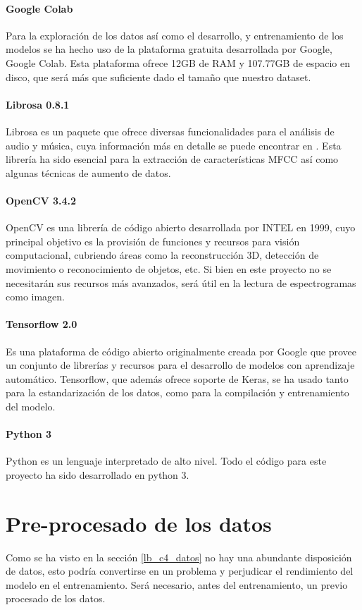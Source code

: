 \documentclass[11pt,a4paper,spanish]{book}
\begin{document}
	
	\paragraph{Google Colab} Para la exploración de los datos así como el desarrollo, y entrenamiento de los modelos se ha hecho uso de la plataforma gratuita desarrollada por Google, Google Colab. Esta plataforma ofrece 12GB de RAM  y 107.77GB de espacio en disco, que será más que suficiente dado el tamaño que nuestro dataset.
	
	\paragraph{Librosa 0.8.1} Librosa es un paquete que ofrece diversas funcionalidades para el análisis de audio y música, cuya información más en detalle se puede encontrar en \cite{librosa082}. Esta librería ha sido esencial para la extracción de características MFCC así como algunas técnicas de aumento de datos.
	
	\paragraph{OpenCV 3.4.2} OpenCV es una librería de código abierto desarrollada por INTEL en 1999, cuyo principal objetivo es la provisión de funciones y recursos para visión computacional, cubriendo áreas como la reconstrucción 3D, detección de movimiento o reconocimiento de objetos, etc. Si bien en este proyecto no se necesitarán sus recursos más avanzados, será útil en la lectura de espectrogramas como imagen. 
	
	\paragraph{Tensorflow 2.0} Es una plataforma de código abierto originalmente creada por Google que provee un conjunto de librerías y recursos para el desarrollo de modelos con aprendizaje automático. Tensorflow, que además ofrece soporte de Keras, se ha usado tanto para la estandarización de los datos, como para la compilación y entrenamiento del modelo.
	
	\paragraph{Python 3} Python es un lenguaje interpretado de alto nivel. Todo el código para este proyecto ha sido desarrollado en python 3.
	
	\section{Pre-procesado de los datos}
	Como se ha visto en la sección \ref{lb_c4_datos} no hay una abundante disposición de datos, esto podría convertirse en un problema y perjudicar el rendimiento del modelo en el entrenamiento. 
	Será necesario, antes del entrenamiento, un previo procesado de los datos.
	
\end{document}
